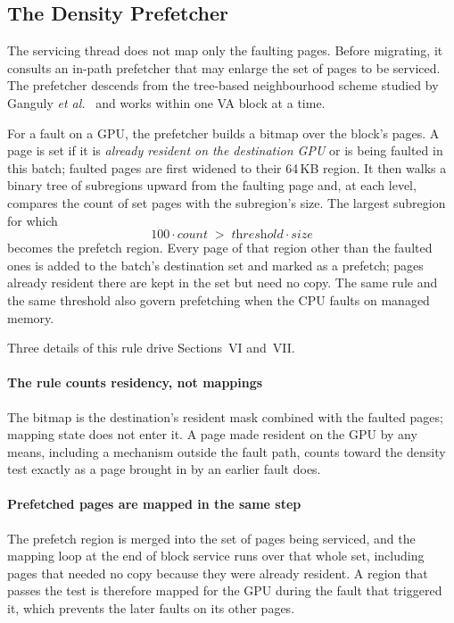 \subsection{The Density Prefetcher}
\label{sec:bg-prefetcher}

The servicing thread does not map only the faulting pages. Before migrating,
it consults an in-path prefetcher that may enlarge the set of pages to be
serviced. The prefetcher descends from the tree-based neighbourhood scheme
studied by Ganguly \emph{et al.}\ \cite{ganguly2019interplay} and works within
one VA block at a time.

For a fault on a GPU, the prefetcher builds a bitmap over the block's pages.
A page is set if it is \emph{already resident on the destination GPU} or is
being faulted in this batch; faulted pages are first widened to their 64\,KB
region. It then walks a binary tree of subregions upward from the faulting
page and, at each level, compares the count of set pages with the
subregion's size. The largest subregion for which
\begin{equation}
  100 \cdot \textit{count} \;>\; \textit{threshold} \cdot \textit{size}
  \label{eq:density}
\end{equation}
becomes the prefetch region. Every page of that region other than the
faulted ones is added to the batch's destination set and marked as a
prefetch; pages already resident there are kept in the set but need no copy.
The same rule and the same threshold also govern prefetching when the CPU
faults on managed memory.

Three details of this rule drive Sections~VI and~VII.

\paragraph{The rule counts residency, not mappings}
The bitmap is the destination's resident mask combined with the faulted
pages; mapping state does not enter it. A page made resident on the GPU by
any means, including a mechanism outside the fault path, counts toward the
density test exactly as a page brought in by an earlier fault does.

\paragraph{Prefetched pages are mapped in the same step}
The prefetch region is merged into the set of pages being serviced, and the
mapping loop at the end of block service runs over that whole set, including
pages that needed no copy because they were already resident. A region that
passes the test is therefore mapped for the GPU during the fault that
triggered it, which prevents the later faults on its other pages.

